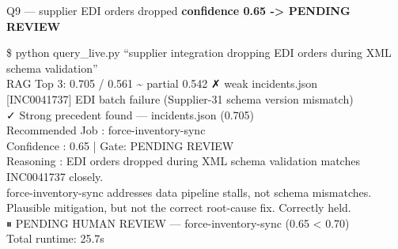 \begin{frame}{Q9 — supplier EDI orders dropped}
  {\color{camber}\ttfamily\small\bfseries confidence 0.65 -> PENDING REVIEW}
  \vspace{0.15cm}
  \begin{terminal}
    \$ python query\_live.py ``supplier integration dropping EDI orders during XML schema validation''\\

    RAG Top 3: {\color{cauto}0.705 / 0.561 \textasciitilde{} partial}  {\color{camber}0.542 ✗ weak}  incidents.json\\
    \hspace*{0.4cm}[INC0041737] EDI batch failure (Supplier-31 schema version mismatch)\\

    ✓ Strong precedent found — incidents.json (0.705)\\

    Recommended Job : {\color{camber}force-inventory-sync}\\
    Confidence      : {\color{camber}0.65}  |  Gate: {\color{camber}PENDING REVIEW}\\
    Reasoning       : EDI orders dropped during XML schema validation matches INC0041737 closely.\\
    \hspace*{0.4cm}force-inventory-sync addresses data pipeline stalls, not schema mismatches.\\
    \hspace*{0.4cm}Plausible mitigation, but not the correct root-cause fix. Correctly held.\\

    {\color{camber}⏸  PENDING HUMAN REVIEW  —  force-inventory-sync  (0.65 < 0.70)}\\
    Total runtime: 25.7s
  \end{terminal}
\end{frame}

